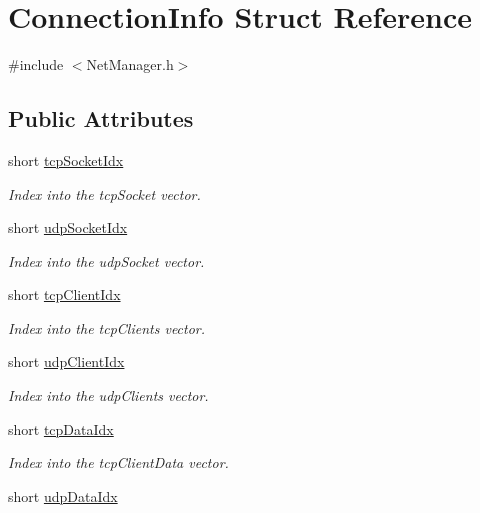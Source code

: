 \hypertarget{structConnectionInfo}{\section{Connection\-Info Struct Reference}
\label{structConnectionInfo}
}


{\ttfamily \#include $<$Net\-Manager.\-h$>$}

\subsection*{Public Attributes}
\begin{DoxyCompactItemize}
\item 
short \hyperlink{structConnectionInfo_a1e837b6519e7035ad689232289931e82}{tcp\-Socket\-Idx}
\begin{DoxyCompactList}\small\item\em Index into the tcp\-Socket vector. \end{DoxyCompactList}\item 
short \hyperlink{structConnectionInfo_ac52c36a648203e28b495cea6d7ad29ba}{udp\-Socket\-Idx}
\begin{DoxyCompactList}\small\item\em Index into the udp\-Socket vector. \end{DoxyCompactList}\item 
short \hyperlink{structConnectionInfo_ae70551f232fc576d4f52e0c610c5d62c}{tcp\-Client\-Idx}
\begin{DoxyCompactList}\small\item\em Index into the tcp\-Clients vector. \end{DoxyCompactList}\item 
short \hyperlink{structConnectionInfo_a645bd416fa05c5b41ebe4fe06e3b6999}{udp\-Client\-Idx}
\begin{DoxyCompactList}\small\item\em Index into the udp\-Clients vector. \end{DoxyCompactList}\item 
short \hyperlink{structConnectionInfo_ae74bd85133eb1b4c3cec7431c280fa13}{tcp\-Data\-Idx}
\begin{DoxyCompactList}\small\item\em Index into the tcp\-Client\-Data vector. \end{DoxyCompactList}\item 
short \hyperlink{structConnectionInfo_a77f71cc46ad9033a81184cae84170277}{udp\-Data\-Idx}

\end{DoxyCompactItemize}
